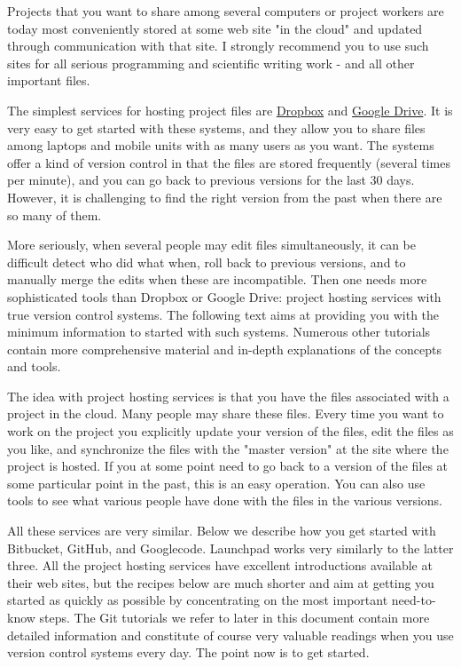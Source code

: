 \n\documentclass[%
oneside,                 %
final,                   %
10pt]{article}
\theoremstyle{definition}
\begin{document}
\begin{enumerate}
Projects that you want to share among several computers or project
workers are today most conveniently stored at some web site "in the
cloud" and updated through communication with that site. I strongly
recommend you to use such sites for all serious programming and
scientific writing work - and all other important files.

The simplest services for hosting project files are \href{{https://dropbox.com}}{Dropbox} and \href{{https://drive.google.com}}{Google Drive}.
It is very easy to get started with these systems, and they allow you
to share files among laptops and mobile units with as many users as
you want. The systems offer a kind of version control in that the
files are stored frequently (several times per minute), and you can go
back to previous versions for the last 30 days. However, it is
challenging  to find the right version from the past when there are
so many of them.

More seriously, when several people may edit files simultaneously, it
can be difficult detect who did what when, roll back to previous
versions, and to manually merge the edits when these are
incompatible. Then one needs more sophisticated tools than Dropbox or
Google Drive: project hosting services with true version control
systems.  The following text aims at providing you with the minimum
information to started with such systems. Numerous other tutorials
contain more comprehensive material and in-depth explanations of the
concepts and tools.

The idea with project hosting services is that you have the files
associated with a project in the cloud. Many people may share these
files.  Every time you want to work on the project you explicitly
update your version of the files, edit the files as you like, and
synchronize the files with the "master version" at the site where the
project is hosted.  If you at some point need to go back to a
version of the files at some particular point in the past,
this is an easy operation. You can also use tools to see
what various people have done with the files in the various versions.

All these services are very similar. Below we describe how you get
started with Bitbucket, GitHub, and Googlecode. Launchpad works very
similarly to the latter three. All the project hosting services have
excellent introductions available at their web sites, but the recipes
below are much shorter and aim at getting you started as quickly as
possible by concentrating on the most important need-to-know steps.
The Git tutorials we refer to later in this document contain more
detailed information and constitute of course very valuable readings
when you use version control systems every day. The point now is
to get started.


\end{enumerate}
\end{document}
